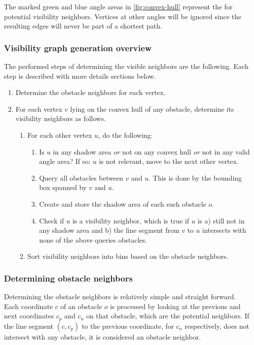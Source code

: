 				The marked green and blue angle areas in \cref{fig:convex-hull} represent the  for potential visibility neighbors.
				Vertices at other angles will be ignored since the resulting edges will never be part of a shortest path.
			
			\subsubsection{Visibility graph generation overview}
			
				The performed steps of determining the visible neighbors are the following.
				Each step is described with more details sections below.
				\begin{enumerate}
					\item Determine the obstacle neighbors for each vertex.
					\item For each vertex $v$ lying on the convex hull of any obstacle, determine its visibility neighbors as follows.
					\begin{enumerate}
						\item For each other vertex $u$, do the following:
						\begin{enumerate}
							\item Is $u$ in any shadow area \emph{or} not on any convex hull \emph{or} not in any valid angle area? If so: $u$ is not relevant, move to the next other vertex.
							\item Query all obstacles between $v$ and $u$. This is done by the bounding box spanned by $v$ and $u$.
							\item Create and store the shadow area of each such obstacle $o$.
							\item Check if $u$ is a visibility neighbor, which is true if $u$ is a) still not in any shadow area and b) the line segment from $v$ to $u$ intersects with none of the above queries obstacles.
						\end{enumerate}
						\item Sort visibility neighbors into bins based on the obstacle neighbors.
					\end{enumerate}
				\end{enumerate}
			
			\subsubsection{Determining obstacle neighbors}
				
				Determining the obstacle neighbors is relatively simple and straight forward.
				Each coordinate $c$ of an obstacle $o$ is processed by looking at the previous and next coordinates $c_p$ and $c_n$ on that obstacle, which are the potential neighbors.
				If the line segment $(c, c_p)$ to the previous coordinate, for $c_n$ respectively, does not intersect with any obstacle, it is considered an obstacle neighbor.
				
